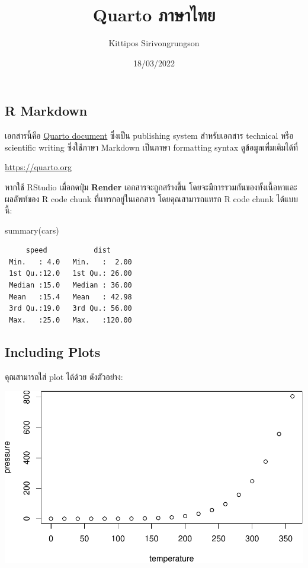 \documentclass[
  letterpaper,
  DIV=11,
  numbers=noendperiod]{scrartcl}
\title{Quarto ภาษาไทย}
\author{Kittipos Sirivongrungson}
\date{18/03/2022}
\newenvironment{Shaded}{\begin{snugshade}}{\end{snugshade}}
\newcommand{\FunctionTok}[1]{\textcolor[rgb]{0.28,0.35,0.67}{#1}}
\newcommand{\NormalTok}[1]{\textcolor[rgb]{0.00,0.46,0.62}{#1}}
\renewcommand*\contentsname{Table of contents}
\begin{document}
\maketitle

\renewcommand*\contentsname{Table of contents}
{
\hypersetup{linkcolor=}
\setcounter{tocdepth}{3}
\tableofcontents
}
\sloppy %

\hypertarget{r-markdown}{%
\subsection{R Markdown}\label{r-markdown}}

เอกสารนี้คือ \href{https://quarto.org}{Quarto document} ซึ่งเป็น
publishing system สำหรับเอกสาร technical หรือ scientific writing
ซึ่งใช้ภาษา Markdown เป็นภาษา formatting syntax ดูข้อมูลเพื่มเติมได้ที่

\url{https://quarto.org}

หากใช้ RStudio เมื่อกดปุ่ม \textbf{Render} เอกสารจะถูกสร้างขึ้น
โดยจะมีการรวมกันของทั้งเนื้อหาและผลลัพท์ของ R code chunk
ที่แทรกอยู่ในเอกสาร โดยคุณสามารถแทรก R code chunk ได้แบบนี้:

\begin{Shaded}
\begin{Highlighting}[]
\FunctionTok{summary}\NormalTok{(cars)}
\end{Highlighting}
\end{Shaded}

\begin{verbatim}
     speed           dist       
 Min.   : 4.0   Min.   :  2.00  
 1st Qu.:12.0   1st Qu.: 26.00  
 Median :15.0   Median : 36.00  
 Mean   :15.4   Mean   : 42.98  
 3rd Qu.:19.0   3rd Qu.: 56.00  
 Max.   :25.0   Max.   :120.00  
\end{verbatim}

\hypertarget{plot}{%
\subsection{Including Plots}\label{plot}}

คุณสามารถใส่ plot ได้ด้วย ดังตัวอย่าง:

\includegraphics{thai_files/figure-pdf/pressure-1.pdf}
\end{document}
